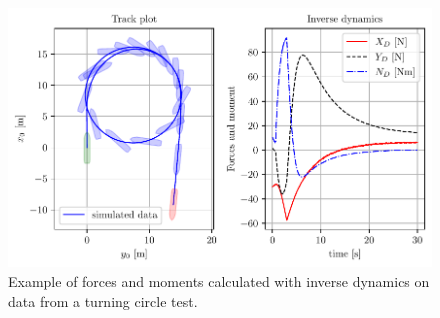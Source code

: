 \begin{figure}[H]
    \centering
    \includegraphics[width=\textwidth]{kappa/images/1.pdf}
    \caption{Example of forces and moments calculated with inverse dynamics on data from a turning circle test.}
    \label{\detokenize{03.01_inverse_dynamics:fig-inverse}}
\end{figure}

